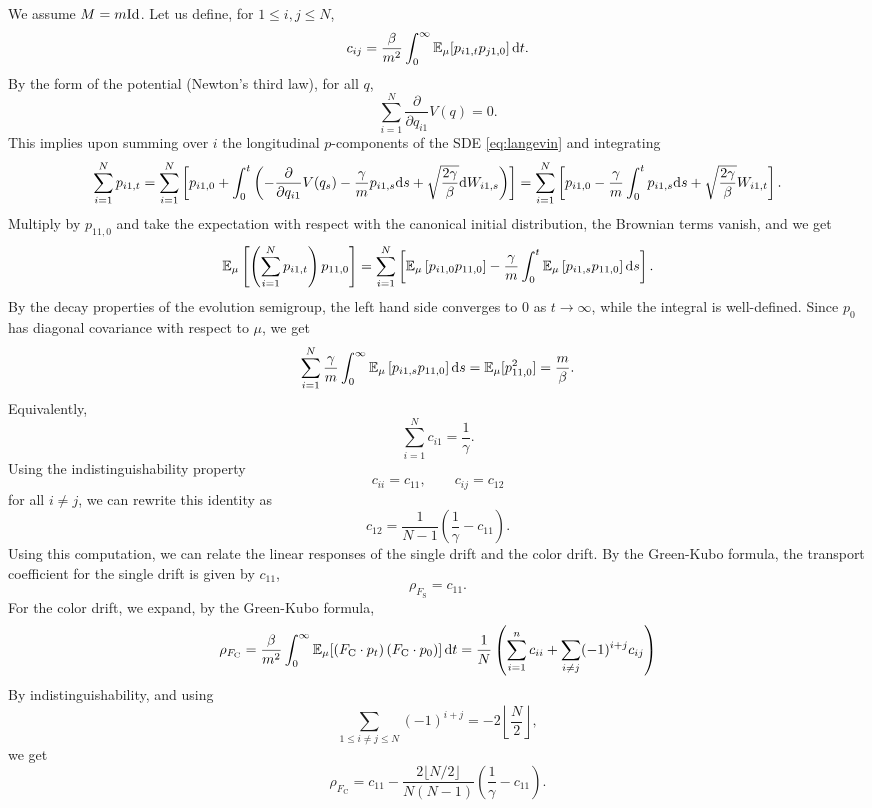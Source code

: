 \begin{example}
We assume $M=m\mathrm{Id}$. Let us define, for $1\leq i,j\leq N$,
\[c_{ij}=\frac{\beta}{m^2} \int_{0}^\infty \mathbb{E}_\mu[p_{i1,t}p_{j1,0}]\,\mathrm{d} t.\]
By the form of the potential (Newton's third law), for all $q$,
\[\sum_{i=1}^N \frac{\partial}{\partial q_{i1}}V(q)=0.\]
This implies upon summing over $i$ the longitudinal $p$-components of the SDE \eqref{eq:langevin} and integrating
\[\sum_{i=1}^N p_{i1,t}= \sum_{i=1}^N \left[p_{i1,0}+\int_0^t \left(-\frac{\partial}{\partial q_{i1}}V(q_s)-\frac{\gamma}{m} p_{i1,s}\mathrm{d} s +\sqrt{\frac{2\gamma}\beta}\mathrm{d} W_{i1,s}\right)\right]=
\sum_{i=1}^N \left[p_{i1,0}-\frac{\gamma}{m}\int_0^t  p_{i1,s}\mathrm{d} s +\sqrt{\frac{2\gamma}\beta} W_{i1,t}\right].\]
Multiply by $p_{11,0}$ and take the expectation with respect with the canonical initial distribution, the Brownian terms vanish, and we get
\begin{equation}
    \mathbb{E}_\mu\left[\left(\sum_{i=1}^N p_{i1,t}\right)p_{11,0}\right]=\sum_{i=1}^N\left[ \mathbb{E}_\mu\left[p_{i1,0}p_{11,0}\right]-\frac{\gamma}{m}\int_0^t \mathbb{E}_\mu\left[p_{i1,s}p_{11,0}\right]\mathrm{d} s\right].
\end{equation}
By the decay properties of the evolution semigroup, the left hand side converges to $0$ as $t\to \infty$, while the integral is well-defined. Since $p_0$ has diagonal covariance with respect to $\mu$, we get
\begin{equation}
    \sum_{i=1}^N \frac{\gamma}m\int_0^\infty \mathbb{E}_\mu\left[p_{i1,s}p_{11,0}\right]\mathrm{d} s=\mathbb{E}_\mu[p_{11,0}^2]=\frac{m}{\beta}.
\end{equation}
Equivalently, 
\[\sum_{i=1}^N c_{i1}=\frac{1}{\gamma}.\]
Using the indistinguishability property
 \[c_{ii}=c_{11},\qquad c_{ij}=c_{12}\] for all $i\neq j$,
 we can rewrite this identity as 
 \[c_{12}=\frac{1}{N-1}\left(\frac{1}{\gamma}-c_{11}\right).\]
Using this computation, we can relate the linear responses of the single drift and the color drift.
By the Green-Kubo formula, the transport coefficient for the single drift is given by $c_{11}$,
\[\rho_{F_{\mathrm{S}}}=c_{11}.\]
For the color drift, we expand, by the Green-Kubo formula,
\[\rho_{F_{\mathrm{C}}}=\frac{\beta}{m^2} \int_0^\infty \mathbb{E}_\mu[\left(F_{\mathrm{C}}\cdot p_t\right)\left(F_{\mathrm{C}}\cdot p_0\right)]\,\mathrm{d} t=\frac1N\left(\sum_{i=1}^n c_{ii} + \sum_{i\neq j}(-1)^{i+j}c_{ij}\right)\]
By indistinguishability, and using
\[\sum_{1\leq i\neq j\leq N}(-1)^{i+j}=-2\left\lfloor \frac{N}{2}\right\rfloor,\]
we get 
\begin{equation}
    \rho_{F_{\mathrm{C}}}=c_{11}-\frac{2\lfloor N/2 \rfloor}{N(N-1)}\left(\frac1{\gamma}-c_{11}\right).
\end{equation}
\end{example}
